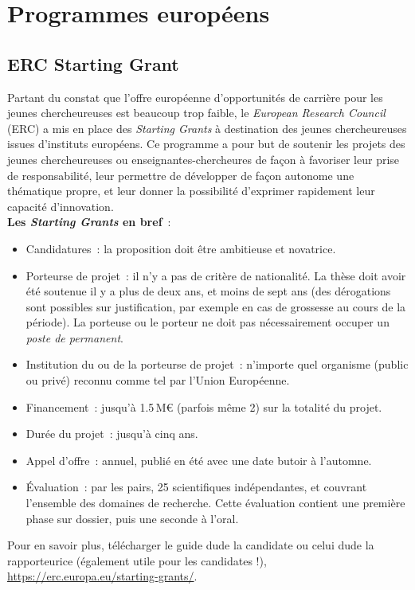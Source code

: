\section{Programmes europ\'eens}

\subsection{ERC Starting Grant}

Partant du constat que l'offre europ\'eenne d'opportunit\'es de carri\`ere pour les jeunes chercheur\mp euse\mp s est
 beaucoup trop faible, le \textit{European Research Council} (ERC) a mis en place 
 des \textit{Starting Grants}
\`a destination des jeunes chercheur\mp euse\mp s issu\mp e\mp s d'instituts europ\'eens. Ce programme a pour but de soutenir
 les projets des jeunes chercheur\mp euse\mp s ou enseignant\mp e\mp s-chercheur\mp e\mp s de fa\c con \`a favoriser leur prise de
responsabilit\'e, leur permettre de d\'evelopper de fa\c con autonome une th\'ematique propre, 
et leur donner la possibilit\'e d'exprimer rapidement leur capacit\'e d'innovation. \\

\textbf{Les \textit{Starting Grants} en bref}~:
\begin{itemize}
\item Candidatures~: la proposition doit \^etre ambitieuse et novatrice.
\item Porteur\mp se de projet~: il n'y a pas de crit\`ere de nationalit\'e. La th\`ese doit avoir \'et\'e soutenue il y a plus de deux ans, et moins de sept ans (des d\'erogations sont possibles sur justification, par exemple en cas de grossesse au cours de la p\'eriode). La porteuse ou le porteur ne doit pas n{\'e}cessairement occuper un \textit{poste de permanent}.
\item Institution du ou de la porteur\mp se de projet~: n'importe quel organisme (public ou priv\'e) reconnu comme tel par l'Union Europ\'eenne.
\item Financement~: jusqu'\`a 1.5\,M\euro{} (parfois m\^eme 2) sur la totalit\'e du projet.
\item Dur\'ee du projet~: jusqu'\`a cinq ans.
\item Appel d'offre~: annuel, publi\'e en \'et\'e avec une date butoir \`a l'automne.
\item \'Evaluation~: par les pairs, 25 scientifiques ind\'ependant\mp e\mp s, et couvrant l'ensemble des domaines de recherche. Cette {\'e}valuation contient une premi{\`e}re phase sur dossier, puis une seconde {\`a} l'oral.
\end{itemize}
Pour en savoir plus, t\'el\'echarger le guide du\mp de la candidat\mp e ou celui du\mp de la rapporteur\mp ice (\'egalement utile pour les candidat\mp e\mp s !),  \url{https://erc.europa.eu/starting-grants/}.



